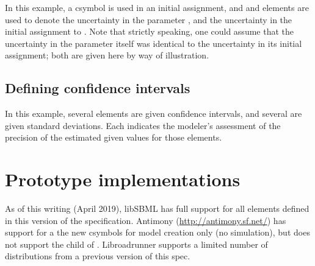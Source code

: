 \documentclass[draftspec]{sbmlpkgspec}
\begin{document}
In this example, a  csymbol is used in an initial assignment, and  and  elements are used to denote the uncertainty in the parameter , and the uncertainty in the initial assignment to .  Note that strictly speaking, one could assume that the uncertainty in the parameter itself was identical to the uncertainty in its initial assignment; both are given here by way of illustration.



\subsection{Defining confidence intervals }

In this example, several \Parameter elements are given confidence intervals, and several \Species are given standard deviations.  Each indicates the modeler's assessment of the precision of the estimated given values for those elements.  







\section{Prototype implementations}

As of this writing (April 2019), libSBML has full support for all elements defined in this version of the specification.  Antimony (\url{http://antimony.sf.net/}) has support for a the new csymbols for model creation only (no simulation), but does not support the  child of \SBase.  Libroadrunner supports a limited number of distributions from a previous version of this spec.

\end{document}
